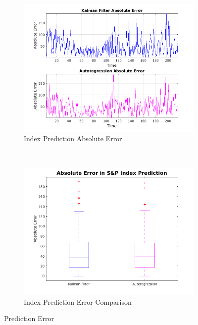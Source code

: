 \documentclass[11pt, fleqn]{article}
\begin{document}
\begin{figure}[!h]
    \centering
    \begin{subfigure}[b]{0.45\textwidth}
        \includegraphics[width=\textwidth]{kalman-autoreg-error.png}
		\caption{Index Prediction Absolute Error}
		\label{fig:kalman-autoreg-error}
    \end{subfigure}
    ~ 
    \begin{subfigure}[b]{0.42\textwidth}
        \includegraphics[width=\textwidth]{kalman-autoreg-error-boxplot.png}
		\caption{Index Prediction Error Comparison}
		\label{fig:kalman-autoreg-error-boxplot}
    \end{subfigure}
    \caption{Prediction Error}
	\label{fig:prediction-error}
\end{figure}
\end{document}
